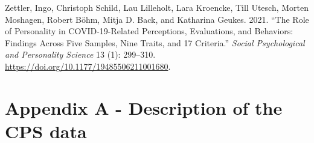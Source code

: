 \documentclass[
]{template/style/uneceart}
\newlength{\cslhangindent}
\newlength{\cslentryspacingunit} %
\newenvironment{CSLReferences}[2] %
 {%
  \setlength{\parindent}{0pt}
  \ifodd #1
  \let\oldpar\par
  \def\par{\hangindent=\cslhangindent\oldpar}
  \fi
  \setlength{\parskip}{#2\cslentryspacingunit}
 }%
 {}
\begin{document}
\begin{CSLReferences}{1}{0}
\leavevmode{}%
Zettler, Ingo, Christoph Schild, Lau Lilleholt, Lara Kroencke, Till
Utesch, Morten Moshagen, Robert Böhm, Mitja D. Back, and Katharina
Geukes. 2021. {``The Role of Personality in COVID-19-Related
Perceptions, Evaluations, and Behaviors: Findings Across Five Samples,
Nine Traits, and 17 Criteria.''} \emph{Social Psychological and
Personality Science} 13 (1): 299--310.
\url{https://doi.org/10.1177/19485506211001680}.

\end{CSLReferences}

\clearpage

\hypertarget{appendix-a---description-of-the-cps-data}{%
\section{Appendix A - Description of the CPS
data}\label{appendix-a---description-of-the-cps-data}}
\end{document}
